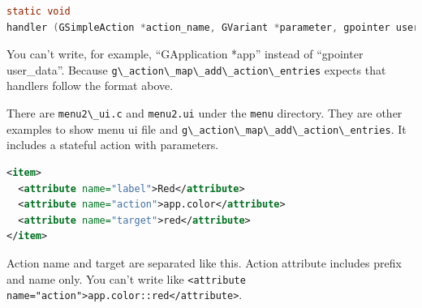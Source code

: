 \begin{lstlisting}[language=C]
static void
handler (GSimpleAction *action_name, GVariant *parameter, gpointer user_data) { ... ... ... }
\end{lstlisting}

You can't write, for example, ``GApplication *app'' instead of
``gpointer user\_data''. Because
\passthrough{\lstinline!g\_action\_map\_add\_action\_entries!} expects
that handlers follow the format above.

There are \passthrough{\lstinline!menu2\_ui.c!} and
\passthrough{\lstinline!menu2.ui!} under the
\passthrough{\lstinline!menu!} directory. They are other examples to
show menu ui file and
\passthrough{\lstinline!g\_action\_map\_add\_action\_entries!}. It
includes a stateful action with parameters.

\begin{lstlisting}[language=XML]
<item>
  <attribute name="label">Red</attribute>
  <attribute name="action">app.color</attribute>
  <attribute name="target">red</attribute>
</item>
\end{lstlisting}

Action name and target are separated like this. Action attribute
includes prefix and name only. You can't write like
\passthrough{\lstinline!<attribute name="action">app.color::red</attribute>!}.
